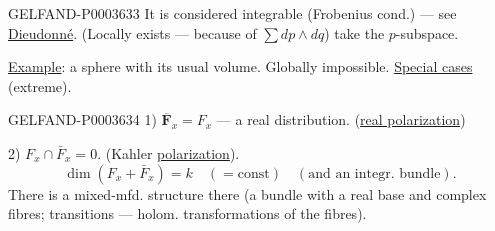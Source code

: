 \begin{GelfandAdjacentEvidence}{GELFAND-P000363}{3}
It is considered integrable (Frobenius cond.) --- see \uline{Dieudonné}.
(Locally exists --- because of $\sum dp\wedge dq$) take the $p$-subspace.



\end{GelfandAdjacentEvidence}

\uline{Example}: a sphere with its usual volume. Globally impossible.
\uline{Special cases} (extreme).

\begin{GelfandAdjacentEvidence}{GELFAND-P000363}{4}
1) $\overline{\boldsymbol F}_x=F_x$ --- a real distribution. (\uline{real polarization})
\end{GelfandAdjacentEvidence}

2) $F_x\cap\bar F_x=0.$ (Kahler \uline{polarization}).
\begin{equation*}\dim (F_x+\bar F_x)=k\quad (=\mathrm{const})\quad (\text{and an integr. bundle}).\end{equation*}
There is a mixed-mfd. structure there (a bundle with a real base and complex fibres; transitions --- holom. transformations of the fibres).



